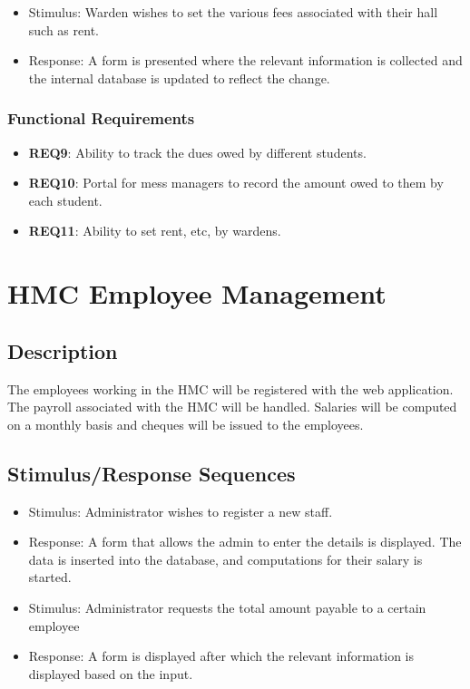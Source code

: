 \documentclass{scrreprt}
\begin{document}
\begin{itemize}
    \item Stimulus: Warden wishes to set the various fees associated with their hall such as rent.
    \item Response: A form is presented where the relevant information is collected and the internal database is updated to reflect the change.
\end{itemize}
\subsubsection{Functional Requirements}
\begin{itemize}
    \item \textbf{REQ9}: Ability to track the dues owed by different students.
    \item \textbf{REQ10}: Portal for mess managers to record the amount owed to them by each student.
    \item \textbf{REQ11}: Ability to set rent, etc, by wardens.
\end{itemize}


\section{HMC Employee Management}
\subsection{Description}
The employees working in the HMC will be registered with the web application. The payroll associated with the HMC will be handled. Salaries will be computed on a monthly basis and cheques will be issued to the employees.
\subsection{Stimulus/Response Sequences}
\begin{itemize}
    \item Stimulus: Administrator wishes to register a new staff.
    \item Response: A form that allows the admin to enter the details is displayed. The data is inserted into the database, and computations for their salary is started.
\end{itemize}

\begin{itemize}
    \item Stimulus: Administrator requests the total amount payable to a certain employee
    \item Response: A form is displayed after which the relevant information is displayed based on the input.
\end{itemize}
\end{document}
